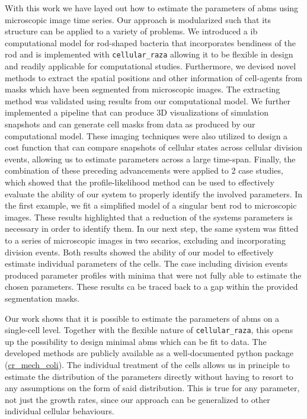 \documentclass{article}
\begin{document}
With this work we have layed out how to estimate the parameters of \acp{abm} using
microscopic image time series.
Our approach is modularized such that its structure can be applied to a variety of problems.
We introduced a \ac{ib} computational model for rod-shaped bacteria that incorporates bendiness of
the rod and is implemented with \texttt{cellular\_raza} allowing it to be flexible in design and
readily applicable for computational studies.
Furthermore, we devised novel methods to extract the spatial positions and other information of
cell-agents from masks which have been segmented from microscopic images.
The extracting method was validated using results from our computational model.
We further implemented a pipeline that can produce 3D visualizations of simulation snapshots and can
generate cell masks from data as produced by our computational model.
These imaging techniques were also utilized to design a cost function that can compare snapshots
of cellular states across cellular division events, allowing us to estimate parameters across a
large time-span.
Finally, the combination of these preceding advancements were applied to 2 case studies, which showed
that the profile-likelihood method can be used to effectively evaluate the ability of our system to
properly identify the involved parameters.
In the first example, we fit a simplified model of a singular bent rod to microscopic images.
These results highlighted that a reduction of the systems parameters is necessary in order to
identify them.
In our next step, the same system was fitted to a series of microscopic images in two secarios,
excluding and incorporating division events.
Both results showed the ability of our model to effectively estimate individual parameters of the
cells.
The case including division events produced parameter profiles with minima that were not fully able
to estimate the chosen parameters.
These results ca be traced back to a gap within the provided segmentation masks.

Our work shows that it is possible to estimate the parameters of \acp{abm} on a single-cell level.
Together with the flexible nature of \texttt{cellular\_raza}, this opens up the possibility to
design minimal \acp{abm} which can be fit to data.
The developed methods are publicly available as a well-documented python package
(\href{https://github.com/jonaspleyer/cr_mech_coli}{cr\_mech\_coli}).
The individual treatment of the cells allows us in principle to estimate the distribution of the
parameters directly without having to resort to any assumptions on the form of said distribution.
This is true for any parameter, not just the growth rates, since our approach can be generalized to
other individual cellular behaviours.
\end{document}
